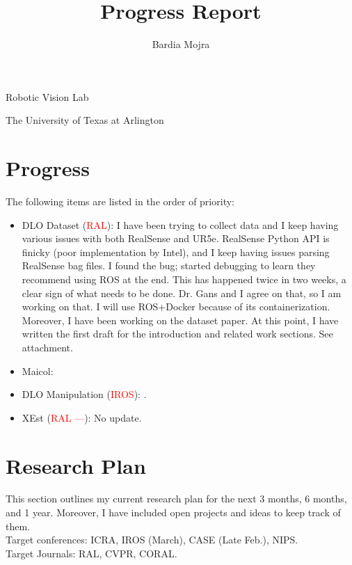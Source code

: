 \documentclass[11pt]{article}
\title{Progress Report}
\author{Bardia Mojra}
\begin{document}
\maketitle
\thispagestyle{empty}

\bigskip
\bigskip
\begin{center}
 Robotic Vision Lab
\end{center}

\begin{center}
The University of Texas at Arlington
\end{center}

\newpage



\section{Progress}
The following items are listed in the order of priority:
\begin{itemize}
  \item DLO Dataset (\textcolor{red}{RAL}): I have been trying to collect data
  and I keep having various issues with both RealSense and UR5e. RealSense
  Python API is finicky (poor implementation by Intel), and I keep having issues
  parsing RealSense bag files. I found the bug; started debugging to learn
  they recommend using ROS at the end. This has happened twice in two weeks,
  a clear sign of what needs to be done. Dr. Gans and I agree on that, so I am
  working on that. I will use ROS+Docker because of its containerization.
  Moreover, I have been working on the dataset paper. At this point, I have
  written the first draft for the introduction and related work sections. See
  attachment. \\
  \item Maicol: \\
  \item DLO Manipulation (\textcolor{red}{IROS}): \cite{abraham2017model}.\\
  \item XEst (\textcolor{red}{RAL ---}): No update.\\
  \end{itemize}

\section{Research Plan}
This section outlines my current research plan for the next 3 months, 6 months,
and 1 year. Moreover, I have included open projects and ideas to keep track of
them.\\
Target conferences: ICRA, IROS (March), CASE (Late Feb.), NIPS.\\
Target Journals: RAL, CVPR, CORAL.\\
\end{document}
